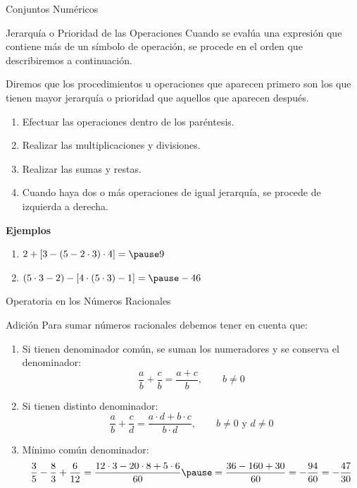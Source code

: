 \documentclass[handout,10pt]{beamer}
\begin{document}
	\begin{frame}{Conjuntos Numéricos}
		\begin{block}{Jerarquía o Prioridad de las Operaciones}
			Cuando se evalúa una expresión que contiene más de un símbolo de operación, se procede en el orden que describiremos a continuación.
			\pause
			
			Diremos que los procedimientos u operaciones que aparecen primero son los que tienen mayor jerarquía o prioridad que aquellos que aparecen después.
			\pause
			
			\begin{enumerate}
				\item Efectuar las operaciones dentro de los paréntesis.
				\pause
				\item Realizar las multiplicaciones y divisiones.
				\pause
				\item Realizar las sumas y restas.
				\pause
				\item Cuando haya dos o más operaciones de igual jerarquía, se procede de izquierda a derecha.
				\pause
			\end{enumerate}
			
			\textbf{Ejemplos}
			\begin{enumerate}
				\item $2+[3-(5-2\cdot3)\cdot4]=\pause 9$
				\pause
				\item $(5\cdot3-2)-[4\cdot(5\cdot3)-1]=\pause -46$
				\pause
			\end{enumerate}
		\end{block}
	\end{frame}
	
	\begin{frame}{Operatoria en los Números Racionales}
		\begin{block}{Adición}
			Para sumar números racionales debemos tener en cuenta que:
			\pause
			
			\begin{enumerate}
				\item Si tienen denominador común, se suman los numeradores y se conserva el denominador:
				\[
				\frac{a}{b}+\frac{c}{b}=\frac{a+c}{b},
				\qquad b\neq0
				\]
				\pause
				
				\item Si tienen distinto denominador:
				\[
				\frac{a}{b}+\frac{c}{d}=\frac{a\cdot d+b\cdot c}{b\cdot d},
				\qquad b\neq0 \text{ y } d\neq0
				\]
				\pause
				
				\item Mínimo común denominador:
				\[
				\frac{3}{5}-\frac{8}{3}+\frac{6}{12}
				=
				\frac{12\cdot3-20\cdot8+5\cdot6}{60}
				\pause
				=
				\frac{36-160+30}{60}
				=
				-\frac{94}{60}
				=
				-\frac{47}{30}
				\]
			\end{enumerate}
		\end{block}
	\end{frame}
	
\end{document}
